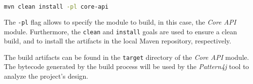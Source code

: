 \begin{center}
	\begin{minipage}{0.5\textwidth}
		\begin{lstlisting}[language=bash, caption={Building the project using Maven}]
    mvn clean install -pl core-api
  \end{lstlisting}
	\end{minipage}
\end{center}

\noindent The \texttt{-pl} flag allows to specify the module to build, in this case, the \emph{Core API} module. Furthermore, the \texttt{clean} and \texttt{install} goals are used to ensure a clean build, and to install the artifacts in the local Maven repository, respectively.

The build artifacts can be found in the \texttt{target} directory of the \emph{Core API} module. The bytecode generated by the build process will be used by the \textit{Pattern4j} tool to analyze the project's design.
